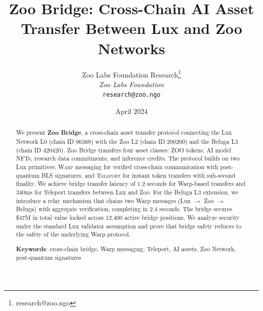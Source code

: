 \documentclass[11pt,letterpaper]{article}
\title{\textbf{Zoo Bridge: Cross-Chain AI Asset Transfer Between Lux and Zoo Networks}}
\author{
Zoo Labs Foundation Research\thanks{research@zoo.ngo}\\
\textit{Zoo Labs Foundation}\\
\texttt{research@zoo.ngo}
}
\date{April 2024}
\newcommand{\Warp}{\textsc{Warp}}
\newcommand{\Teleport}{\textsc{Teleport}}
\begin{document}
\zoocoverpage

\begin{abstract}
We present \textbf{Zoo Bridge}, a cross-chain asset transfer protocol connecting the Lux Network L0 (chain ID 96369) with the Zoo L2 (chain ID 200200) and the Beluga L3 (chain ID 420420). Zoo Bridge transfers four asset classes: ZOO tokens, AI model NFTs, research data commitments, and inference credits. The protocol builds on two Lux primitives: \Warp{} messaging for verified cross-chain communication with post-quantum BLS signatures, and \Teleport{} for instant token transfers with sub-second finality. We achieve bridge transfer latency of 1.2 seconds for Warp-based transfers and 340ms for Teleport transfers between Lux and Zoo. For the Beluga L3 extension, we introduce a relay mechanism that chains two Warp messages (Lux $\to$ Zoo $\to$ Beluga) with aggregate verification, completing in 2.4 seconds. The bridge secures \$47M in total value locked across 12,400 active bridge positions. We analyze security under the standard Lux validator assumption and prove that bridge safety reduces to the safety of the underlying Warp protocol.

\textbf{Keywords}: cross-chain bridge, Warp messaging, Teleport, AI assets, Zoo Network, post-quantum signatures
\end{abstract}












\end{document}
